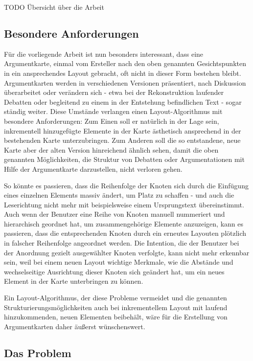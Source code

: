 TODO Übersicht über die Arbeit

\subsection{Besondere Anforderungen}
\label{sub:tasks}

Für die vorliegende Arbeit ist nun besonders interessant, dass eine Argumentkarte, einmal vom Ersteller nach den oben genannten Gesichtspunkten in ein ansprechendes Layout gebracht, oft nicht in dieser Form bestehen bleibt. Argumentkarten werden in verschiedenen Versionen präsentiert, nach Diskussion überarbeitet oder verändern sich - etwa bei der Rekonstruktion laufender Debatten oder begleitend zu einem in der Entstehung befindlichen Text - sogar ständig weiter. Diese Umstände verlangen einen Layout-Algorithmus mit besondere Anforderungen: Zum Einen soll er natürlich in der Lage sein, inkrementell hinzugefügte Elemente in der Karte ästhetisch ansprechend in der bestehenden Karte unterzubringen. Zum Anderen soll die so entstandene, neue Karte aber der alten Version hinreichend ähnlich sehen, damit die oben genannten Möglichkeiten, die Struktur von Debatten oder Argumentationen mit Hilfe der Argumentkarte darzustellen, nicht verloren gehen.

 So könnte es passieren, dass die Reihenfolge der Knoten sich durch die Einfügung eines einzelnen Elements massiv ändert, um Platz zu schaffen - und auch die Leserichtung nicht mehr mit beispielsweise einem Ursprungstext übereinstimmt. Auch wenn der Benutzer eine Reihe von Knoten manuell nummeriert und hierarchisch geordnet hat, um zusammengehörige Elemente anzuzeigen, kann es passieren, dass die entsprechenden Knoten durch ein erneutes Layouten plötzlich in falscher Reihenfolge angeordnet werden. Die Intention, die der Benutzer bei der Anordnung gezielt ausgewählter Knoten verfolgte, kann nicht mehr erkennbar sein, weil bei einem neuen Layout wichtige Merkmale, wie die Abstände und wechselseitige Ausrichtung dieser Knoten sich geändert hat, um ein neues Element in der Karte unterbringen zu können.

 Ein Layout-Algorithmus, der diese Probleme vermeidet und die genannten Strukturierungsmöglichkeiten auch bei inkrementellem Layout mit laufend hinzukommenden, neuen Elementen beibehält, wäre für die Erstellung von Argumentkarten daher äußerst wünschenswert.

\subsection{Das Problem}
\label{sub:problem}

